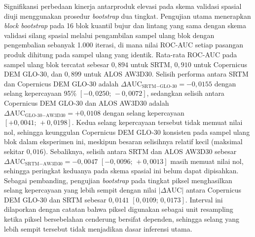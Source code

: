 \documentclass[12pt,a4paper]{article}
\begin{document}
Signifikansi perbedaan kinerja antarproduk elevasi pada skema validasi spasial
diuji menggunakan prosedur \textit{bootstrap} dua tingkat. Pengujian utama
menerapkan \textit{block bootstrap} pada 16 blok kuantil bujur dan lintang
yang sama dengan skema validasi silang spasial melalui pengambilan sampel
ulang blok dengan pengembalian sebanyak 1.000 iterasi, di mana nilai ROC-AUC
setiap pasangan produk dihitung pada sampel ulang yang identik. Rata-rata
ROC-AUC pada sampel ulang blok tercatat sebesar $0{,}894$ untuk SRTM,
$0{,}910$ untuk Copernicus DEM GLO-30, dan $0{,}899$ untuk ALOS AW3D30.
Selisih performa antara SRTM dan Copernicus DEM GLO-30 adalah
$\Delta\text{AUC}_{\text{SRTM}-\text{GLO-30}} = -0{,}0155$ dengan selang
kepercayaan 95\% $[-0{,}0250;\,-0{,}0072]$, sedangkan selisih antara
Copernicus DEM GLO-30 dan ALOS AW3D30 adalah
$\Delta\text{AUC}_{\text{GLO-30}-\text{AW3D30}} = +0{,}0108$ dengan selang
kepercayaan $[+0{,}0041;\,+0{,}0198]$. Kedua selang kepercayaan tersebut tidak
memuat nilai nol, sehingga keunggulan Copernicus DEM GLO-30 konsisten pada
sampel ulang blok dalam eksperimen ini, meskipun besaran selisihnya relatif
kecil (maksimal sekitar $0{,}016$). Sebaliknya, selisih antara SRTM dan ALOS
AW3D30 sebesar $\Delta\text{AUC}_{\text{SRTM}-\text{AW3D30}} = -0{,}0047$
$[-0{,}0096;\,+0{,}0013]$ masih memuat nilai nol, sehingga peringkat keduanya
pada skema spasial ini belum dapat dipisahkan. Sebagai pembanding, pengujian
\textit{bootstrap} pada tingkat piksel menghasilkan selang kepercayaan yang
lebih sempit dengan nilai $|\Delta\text{AUC}|$ antara Copernicus DEM GLO-30
dan SRTM sebesar $0{,}0141$ $[0{,}0109;\,0{,}0173]$. Interval ini dilaporkan
dengan catatan bahwa piksel digunakan sebagai unit resampling ketika piksel
bersebelahan cenderung bersifat dependen, sehingga selang yang lebih sempit
tersebut tidak menjadikan dasar inferensi utama.
\end{document}
